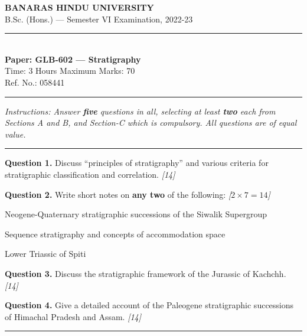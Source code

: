 \documentclass[11pt,a4paper]{article}
\newcommand{\pts}[1]{\hfill   \textit{[#1]}}
\begin{document}
\begin{center}
  {\large\bfseries BANARAS HINDU UNIVERSITY}\\[2pt]
  {\normalsize B.Sc. (Hons.) --- Semester VI Examination, 2022-23}\\[6pt]
  \rule{0.8\linewidth}{0.5pt}\\[6pt]
  {\large\bfseries Paper: GLB-602 --- Stratigraphy}\\[4pt]
  {\normalsize Time: 3 Hours \hfill Maximum Marks: 70}\\[2pt]
  {\small Ref. No.: 058441}
\end{center}
\rule{\linewidth}{0.4pt}
\smallskip



\noindent   \textit{Instructions: Answer   \textbf{five} questions in all, selecting at least   \textbf{two} each from Sections A and B, and Section-C which is compulsory. All questions are of equal value.}
\bigskip

\bigskip


\rule{\linewidth}{0.4pt}\smallskip




\noindent   \textbf{Question 1.} Discuss ``principles of stratigraphy'' and various criteria for stratigraphic classification and correlation. \pts{14}

\medskip


\noindent   \textbf{Question 2.} Write short notes on   \textbf{any two} of the following: \pts{$2  \times 7 = 14$}

\begin{parts}
  \item Neogene-Quaternary stratigraphic successions of the Siwalik Supergroup
  \item Sequence stratigraphy and concepts of accommodation space
  \item Lower Triassic of Spiti
\end{parts}

\medskip


\noindent   \textbf{Question 3.} Discuss the stratigraphic framework of the Jurassic of Kachchh. \pts{14}

\medskip


\noindent   \textbf{Question 4.} Give a detailed account of the Paleogene stratigraphic successions of Himachal Pradesh and Assam. \pts{14}

\bigskip


\rule{\linewidth}{0.4pt}\smallskip
\end{document}
